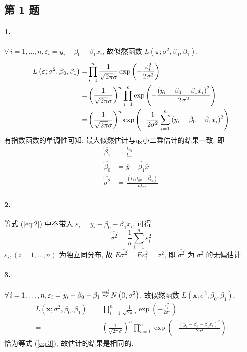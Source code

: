 \documentclass[../main.tex]{subfiles}
\begin{document}
\subsection{第 1 题}
\noindent\paragraph*{1.}
$\forall \, i = 1, \dots, n, \varepsilon_i = y_i - \beta_0 - \beta_1 x_i$, 故似然函数 $L \left( \boldsymbol{\varepsilon}; \sigma^2, \beta_0, \beta_1 \right)$,
\begin{align} \label{eq:2}
    L \left( \boldsymbol{\varepsilon}; \sigma^2, \beta_0, \beta_1 \right)
    =& \prod_{i = 1}^{n} \frac{1}{\sqrt{2 \pi} \sigma} \exp \left( - \frac{\varepsilon_i^2}{2 \sigma^2} \right) \\
    =& \left( \frac{1}{\sqrt{2 \pi} \sigma} \right)^n \prod_{i = 1}^{n} \exp \left( - \frac{\left( y_i - \beta_0 - \beta_1 x_i \right)^2}{2 \sigma^2} \right) \label{eq:3} \\
    =& \left( \frac{1}{\sqrt{2 \pi} \sigma} \right)^n \exp \left( - \frac{1}{2 \sigma^2} \sum_{i = 1}^{n} \left( y_i - \beta_0 - \beta_1 x_i \right)^2 \right) \notag
\end{align}
有指数函数的单调性可知, 最大似然估计与最小二乘估计的结果一致.
即
\begin{align*}
    \widehat{\beta_1} &= \frac{l_{xy}}{l_{xx}} \\
    \widehat{\beta_0} &= \overline{y} - \widehat{\beta_1} \overline{x} \\
    \widehat{\sigma^2} &= \frac{\left( l_{xx} l_{yy} - l_{xy}^2 \right)}{n l_{xx}}
\end{align*}

\noindent\paragraph*{2.}
等式 (\ref{eq:2}) 中不带入 $\varepsilon_i = y_i - \beta_0 - \beta_1 x_i$, 可得
\[
    \widehat{\sigma^2} = \frac{1}{n} \sum_{i = 1}^{n} \varepsilon_i^2
\]
$\varepsilon_i, \left( i = 1, \dots, n \right)$ 为独立同分布,
故 $E \widehat{\sigma^2} = E \varepsilon_i^2 = \sigma^2$,
即 $\widehat{\sigma^2}$ 为 $\sigma^2$ 的无偏估计.

\noindent\paragraph*{3.}
$\forall \, i = 1, \dots, n, \varepsilon_i = y_i - \beta_0 - \beta_1 \overset{iid}{\thicksim} N \left( 0, \sigma^2 \right)$,
故似然函数 $L \left( \boldsymbol{x}; \sigma^2, \beta_0, \beta_1 \right)$,
\begin{align*}
    L \left( \boldsymbol{x}; \sigma^2, \beta_0, \beta_1 \right)
    =& \prod_{i = 1}^{n} \frac{1}{\sqrt{2 \pi} \sigma} \exp \left( - \frac{\varepsilon_i^2}{2 \sigma^2} \right) \\
    =& \left( \frac{1}{\sqrt{2 \pi} \sigma} \right)^n \prod_{i = 1}^{n} \exp \left( - \frac{\left( y_i - \beta_0 - \beta_1 x_i \right)^2}{2 \sigma^2} \right)
\end{align*}
恰为等式 (\ref{eq:3}), 故估计的结果是相同的.
\end{document}
